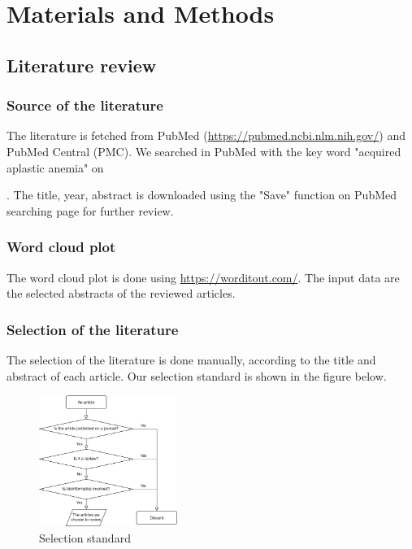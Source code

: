 \section{Materials and Methods}

\subsection{Literature review}

\subsubsection{Source of the literature}
The literature is fetched from PubMed (\url{https://pubmed.ncbi.nlm.nih.gov/})\cite{canese2013pubmed} and PubMed Central (PMC)\cite{roberts2001pubmed}. We searched in PubMed with the key word "acquired aplastic anemia" on \date{\today}. The title, year, abstract is downloaded using the "Save" function on PubMed searching page for further review.

\subsubsection{Word cloud plot}
The word cloud plot is done using \url{https://worditout.com/}. The input data are the selected abstracts of the reviewed articles.

\subsubsection{Selection of the literature}
The selection of the literature is done manually, according to the title and abstract of each article. Our selection standard is shown in the figure below.

\begin{figure}[H]
    \centering
    \includegraphics[width=0.4\textwidth]{image/Classification.png}
    \caption{Selection standard}
    \label{CS}
\end{figure}

